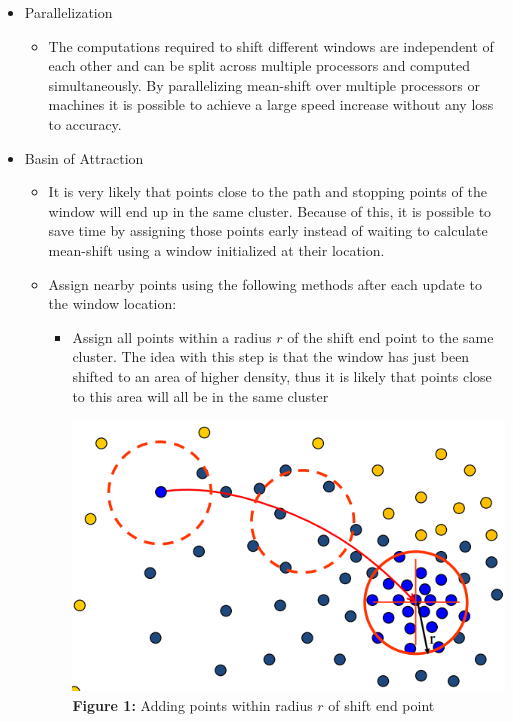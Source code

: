\documentclass{article}
\begin{document}
\begin{itemize}
	\item Parallelization
    \begin{itemize}
    	\item The computations required to shift different windows are independent of each other and can be split across multiple processors and computed simultaneously. By parallelizing mean-shift over multiple processors or machines it is possible to achieve a large speed increase without any loss to accuracy.
    \end{itemize}
	\item Basin of Attraction
    \begin{itemize}
    	\item It is very likely that points close to the path and stopping points of the window will end up in the same cluster. Because of this, it is possible to save time by assigning those points early instead of waiting to calculate mean-shift using a window initialized at their location.
    	\item Assign nearby points using the following methods after each update to the window location:
        \begin{itemize}
        	\item Assign all points within a radius $r$ of the shift end point to the same cluster. The idea with this step is that the window has just been shifted to an area of higher density, thus it is likely that points close to this area will all be in the same cluster
\begin{center}
	\includegraphics[scale=0.5]{basin1.png}\\
    \textbf{Figure 1:} Adding points within radius $r$ of shift end point\\

\end{center}
\end{itemize}
\end{itemize}
\end{itemize}
\end{document}
